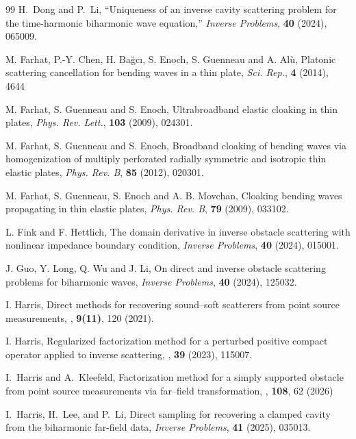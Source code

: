 \documentclass{article}
\begin{document}
\begin{thebibliography}{99}
H.~Dong and P.~Li,
``Uniqueness of an inverse cavity scattering problem for the time-harmonic biharmonic wave equation,''
\newblock \emph{Inverse Problems}, {\bf 40} (2024), 065009.

M. Farhat, P.-Y. Chen, H. Ba\u{g}c\i, S. Enoch, S. Guenneau and A. Al\`u,
Platonic scattering cancellation for bending waves in a thin plate,
\textit{Sci. Rep.}, \textbf{4} (2014), 4644

M. Farhat, S. Guenneau and S. Enoch,
Ultrabroadband elastic cloaking in thin plates,
\textit{Phys. Rev. Lett.}, \textbf{103} (2009), 024301.

M. Farhat, S. Guenneau and S. Enoch,
Broadband cloaking of bending waves via homogenization of multiply perforated radially symmetric and isotropic thin elastic plates,
\textit{Phys. Rev. B}, \textbf{85} (2012), 020301.


M. Farhat, S. Guenneau, S. Enoch and A. B. Movchan,
Cloaking bending waves propagating in thin elastic plates,
\textit{Phys. Rev. B}, \textbf{79} (2009), 033102.

L. Fink and F. Hettlich,
The domain derivative in inverse obstacle scattering with nonlinear impedance boundary condition,
\textit{Inverse Problems}, \textbf{40} (2024), 015001.

J. Guo, Y. Long, Q. Wu and J. Li,
On direct and inverse obstacle scattering problems for biharmonic waves,
\textit{Inverse Problems}, \textbf{40} (2024), 125032.

\newblock  I. Harris, 
\newblock  Direct methods for recovering sound--soft scatterers from point source measurements,
, {\bf 9(11)}, 120 (2021).


I. Harris,
Regularized factorization method for a perturbed positive compact operator applied to inverse scattering,
, {\bf 39} (2023), 115007.

I.~Harris and A.~Kleefeld,
Factorization method for a simply supported obstacle from point source measurements via far--field transformation,
,  {\bf 108}, 62 (2026)

I.~Harris, H.~Lee, and P.~Li,
Direct sampling for recovering a clamped cavity from the biharmonic far-field data,
\emph{Inverse Problems}, \textbf{41} (2025), 035013.


\end{thebibliography}
\end{document}
